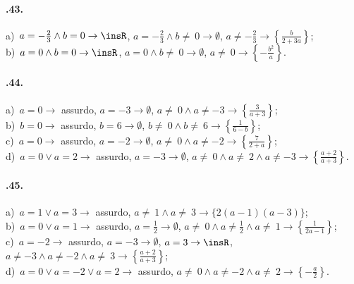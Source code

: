 \paragraph{\thechapter.43.}
a)~$a=-{\frac{2}{3}}\wedge b=0 \rightarrow \insR$, $a=-{\frac{2}{3}}\wedge b\neq~0 \rightarrow \emptyset$, $a\neq -{\frac{2}{3}} \rightarrow \left\{\frac{b}{2+3a}\right\}$;
\protect\\ b)~$a=0\wedge b=0 \rightarrow \insR$, $a=0\wedge b\neq~0 \rightarrow \emptyset$, $a\neq~0 \rightarrow \left\{-{\frac{b^{2}}{a}}\right\}$.

\paragraph{\thechapter.44.}
a)~$a=0 \rightarrow$ assurdo, $a=-3 \rightarrow \emptyset$, $a\neq~0\wedge a\neq -3 \rightarrow \left\{\frac{3}{a+3}\right\}$;
\protect\\ b)~$b=0 \rightarrow$ assurdo, $b=6 \rightarrow \emptyset$, $b\neq~0\wedge b\neq~6 \rightarrow \left\{\frac{1}{6-b}\right\}$;
\protect\\ c)~$a=0 \rightarrow$ assurdo, $a=-2 \rightarrow \emptyset$, $a\neq~0\wedge a\neq -2 \rightarrow \left\{\frac{7}{2+a}\right\}$;
\protect\\ d)~$a=0\vee a=2 \rightarrow$ assurdo, $a=-3 \rightarrow \emptyset$, $a\neq~0\wedge a\neq~2\wedge a\neq -3 \rightarrow \left\{\frac{a+2}{a+3}\right\}$.

\paragraph{\thechapter.45.}
a)~$a=1\vee a=3 \rightarrow$ assurdo, $a\neq~1\wedge a\neq~3 \rightarrow \{2(a-1)(a-3)\}$;
\protect\\ b)~$a=0\vee a=1 \rightarrow$ assurdo, $a=\frac{1}{2} \rightarrow \emptyset$, $a\neq~0\wedge a\neq \frac{1}{2}\wedge a\neq~1 \rightarrow \left\{\frac{1}{2a-1}\right\}$;
\protect\\ c)~$a=-2 \rightarrow$ assurdo, $a=-3 \rightarrow \emptyset$, $a=3 \rightarrow \insR$, $a\neq -3\wedge a\neq -2\wedge a\neq~3 \rightarrow \left\{\frac{a+2}{a+3}\right\}$;
\protect\\ d)~$a=0\vee a=-2\vee a=2 \rightarrow$ assurdo, $a\neq~0\wedge a\neq -2\wedge a\neq~2 \rightarrow \left\{-{\frac{a}{2}}\right\}$.

